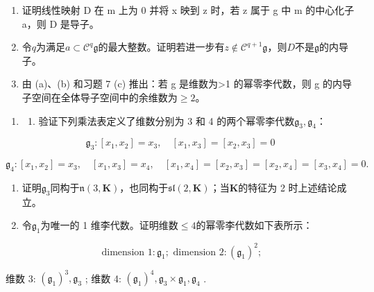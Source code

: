 \begin{enumerate}
\def\labelenumi{(\alph{enumi})}
\item
  证明线性映射 D 在 m 上为 0 并将 x 映到 z 时，若 z 属于 g 中 m 的中心化子 a，则 D 是导子。
\item
  令\(q\)为满足\(a \subset \mathcal{C}^q\mathfrak{g}\)的最大整数。证明若进一步有\(z \notin \mathcal{C}^{q+1}\mathfrak{g}\)，则\(D\)不是\(\mathfrak{g}\)的内导子。
\item
  由 (a)、(b) 和习题 7 (c) 推出：若 g 是维数为\textgreater1 的幂零李代数，则 g 的内导子空间在全体导子空间中的余维数为\(\geqslant2\)。
\end{enumerate}

\begin{enumerate}
\def\labelenumi{\arabic{enumi}.}
\setcounter{enumi}{8}
\tightlist
\item
  \begin{enumerate}
  \def\labelenumii{(\alph{enumii})}
  \tightlist
  \item
    验证下列乘法表定义了维数分别为 3 和 4 的两个幂零李代数\(\mathfrak{g}_3, \mathfrak{g}_4\)：
  \end{enumerate}
\end{enumerate}

\[
\mathfrak {g} _ {3}: \left[ x _ {1}, x _ {2} \right] = x _ {3}, \quad \left[ x _ {1}, x _ {3} \right] = \left[ x _ {2}, x _ {3} \right] = 0
\]

\[
\mathfrak {g} _ {4}: \left[ x _ {1}, x _ {2} \right] = x _ {3}, \quad \left[ x _ {1}, x _ {3} \right] = x _ {4}, \quad \left[ x _ {1}, x _ {4} \right] = \left[ x _ {2}, x _ {3} \right] = \left[ x _ {2}, x _ {4} \right] = \left[ x _ {3}, x _ {4} \right] = 0.
\]

\begin{enumerate}
\def\labelenumi{(\alph{enumi})}
\setcounter{enumi}{1}
\item
  证明\(\mathfrak{g}_3\)同构于\(\mathfrak{n}(3, \mathbf{K})\)，也同构于\(\mathfrak{sl}(2, \mathbf{K})\)；当\(\mathbf{K}\)的特征为 2 时上述结论成立。
\item
  令\(\mathfrak{g}_1\)为唯一的 1 维李代数。证明维数\(\leqslant 4\)的幂零李代数如下表所示：
\end{enumerate}

\[
\text { dimension } 1: \mathfrak {g} _ {1}; \text { dimension } 2: (\mathfrak {g} _ {1}) ^ {2};
\]

维数 3: \((\mathfrak{g}_1)^3, \mathfrak{g}_3\) ; 维数 4: \((\mathfrak{g}_1)^4, \mathfrak{g}_3 \times \mathfrak{g}_1, \mathfrak{g}_4\) .

